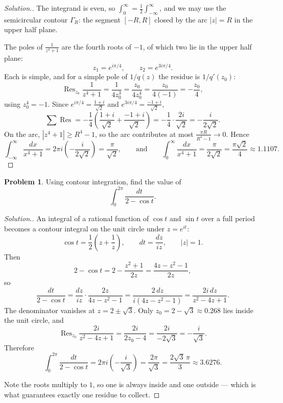 \documentclass[11pt,a4paper]{article}
\theoremstyle{definition}
\newtheorem{problemx}{Problem}[section]
\newenvironment{problem}{\begin{problemx}}{\end{problemx}}
\newenvironment{solution}
  {\renewcommand{\qedsymbol}{}\begin{proof}[\textit{Solution}.]}
  {\end{proof}}
\begin{document}
\begin{solution}
The integrand is even, so
$\displaystyle\int^{\infty}_{0} = \tfrac12\int^{\infty}_{-\infty}$, and we may use
the semicircular contour $\Gamma_R$: the segment $[-R,R]$ closed by the arc
$\left|z\right| = R$ in the upper half plane.

The poles of $\frac{1}{z^4+1}$ are the fourth roots of $-1$, of which two lie in
the upper half plane:
$$z_1 = e^{i\pi/4},\qquad z_2 = e^{3i\pi/4}.$$
Each is simple, and for a simple pole of $1/q(z)$ the residue is $1/q'(z_0)$:
$$\operatorname{Res}_{z_0}\frac{1}{z^4+1} = \frac{1}{4z_0^{3}}
= \frac{z_0}{4z_0^{4}} = \frac{z_0}{4(-1)} = -\frac{z_0}{4},$$
using $z_0^4 = -1$. Since
$e^{i\pi/4} = \frac{1+i}{\sqrt2}$ and $e^{3i\pi/4} = \frac{-1+i}{\sqrt2}$,
$$\sum \operatorname{Res} = -\frac{1}{4}\left(\frac{1+i}{\sqrt2}
+ \frac{-1+i}{\sqrt2}\right) = -\frac{1}{4}\cdot\frac{2i}{\sqrt2}
= -\frac{i}{2\sqrt2}.$$
On the arc, $\left|z^4+1\right| \geq R^4 - 1$, so the arc contributes at most
$\frac{\pi R}{R^4-1} \rightarrow 0$. Hence
$$\int^{\infty}_{-\infty}\frac{dx}{x^4+1}
= 2\pi i\left(-\frac{i}{2\sqrt2}\right) = \frac{\pi}{\sqrt2},
\qquad\text{and}\qquad
\boxed{\int^{\infty}_{0}\frac{dx}{x^4+1} = \frac{\pi}{2\sqrt2}
= \frac{\pi\sqrt2}{4} \approx 1.1107 .}$$
\end{solution}


\begin{problem}
Using contour integration, find the value of
$$\int^{2\pi}_{0}\frac{dt}{2 - \cos t} .$$
\end{problem}

\begin{solution}
An integral of a rational function of $\cos t$ and $\sin t$ over a full period
becomes a contour integral on the unit circle under $z = e^{it}$:
$$\cos t = \frac{1}{2}\left(z + \frac{1}{z}\right),\qquad
dt = \frac{dz}{iz},\qquad \left|z\right| = 1 .$$
Then
$$2 - \cos t = 2 - \frac{z^2+1}{2z} = \frac{4z - z^2 - 1}{2z},$$
so
$$\frac{dt}{2-\cos t} = \frac{dz}{iz}\cdot\frac{2z}{4z-z^2-1}
= \frac{2\,dz}{i\left(4z - z^2 - 1\right)}
= \frac{2i\,dz}{z^2 - 4z + 1}.$$
The denominator vanishes at $z = 2 \pm \sqrt3$. Only
$z_0 = 2-\sqrt3 \approx 0.268$ lies inside the unit circle, and
$$\operatorname{Res}_{z_0}\frac{2i}{z^2-4z+1} = \frac{2i}{2z_0-4}
= \frac{2i}{-2\sqrt3} = -\frac{i}{\sqrt3}.$$
Therefore
$$\int^{2\pi}_{0}\frac{dt}{2-\cos t}
= 2\pi i\left(-\frac{i}{\sqrt3}\right)
= \boxed{\frac{2\pi}{\sqrt3} = \frac{2\sqrt3\,\pi}{3} \approx 3.6276 .}$$

Note the roots multiply to $1$, so one is always inside and one outside --- which
is what guarantees exactly one residue to collect.
\end{solution}
\end{document}
